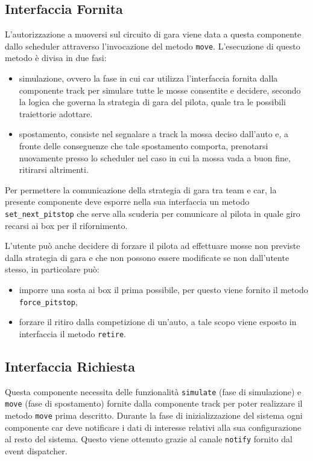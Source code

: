 \documentclass[11pt,a4paper]{report}
\newcommand{\fun}[1]{\texttt{#1}}
\begin{document}
\subsection*{Interfaccia Fornita}
L'autorizzazione a muoversi sul circuito di gara viene data a questa componente dallo scheduler attraverso l'invocazione del metodo \fun{move}. L'esecuzione di questo metodo è divisa in due fasi:
\begin{itemize}
\item simulazione, ovvero la fase in cui car utilizza l'interfaccia fornita dalla componente track per simulare tutte le mosse consentite e decidere, secondo la logica che governa la strategia di gara del pilota, quale tra le possibili traiettorie adottare.
\item spostamento, consiste nel segnalare a track la mossa deciso dall'auto e, a fronte delle conseguenze che tale spostamento comporta, prenotarsi nuovamente presso lo scheduler nel caso in cui la mossa vada a buon fine, ritirarsi altrimenti.
\end{itemize}

Per permettere la comunicazione della strategia di gara tra team e car, la presente componente deve esporre nella sua interfaccia un metodo \fun{set\_next\_pitstop} che serve alla scuderia per comunicare al pilota in quale giro recarsi ai box per il rifornimento.

L'utente può anche decidere di forzare il pilota ad effettuare mosse non previste dalla strategia di gara e che non possono essere modificate se non dall'utente stesso, in particolare può:
\begin{itemize}
\item imporre una sosta ai box il prima possibile, per questo viene fornito il metodo \fun{force\_pitstop},
\item forzare il ritiro dalla competizione di un'auto, a tale scopo viene esposto in interfaccia il metodo \fun{retire}.
\end{itemize}
\subsection*{Interfaccia Richiesta}
Questa componente necessita delle funzionalità \fun{simulate} (fase di simulazione) e \fun{move} (fase di spostamento) fornite dalla componente track per poter realizzare il metodo \fun{move} prima descritto.
Durante la fase di inizializzazione del sistema ogni componente car deve notificare i dati di interesse relativi alla sua configurazione al resto del sistema. Questo viene ottenuto grazie al canale \fun{notify} fornito dal event dispatcher.
\end{document}
